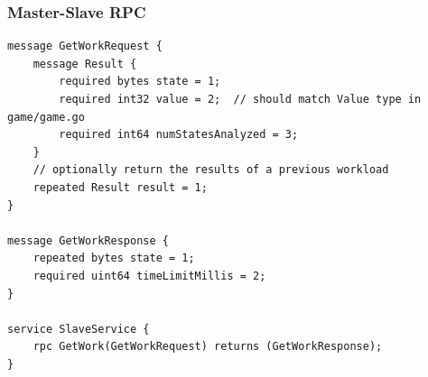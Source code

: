\documentclass[pdftex,12pt,a4paper]{article}
\begin{document}
\subsubsection*{Master-Slave RPC}
\begin{lstlisting}
message GetWorkRequest {
    message Result {
        required bytes state = 1;
        required int32 value = 2;  // should match Value type in game/game.go
        required int64 numStatesAnalyzed = 3;
    }
    // optionally return the results of a previous workload
    repeated Result result = 1;
}

message GetWorkResponse {
    repeated bytes state = 1;
    required uint64 timeLimitMillis = 2;
}

service SlaveService {
    rpc GetWork(GetWorkRequest) returns (GetWorkResponse);
}
\end{lstlisting}
\end{document}
